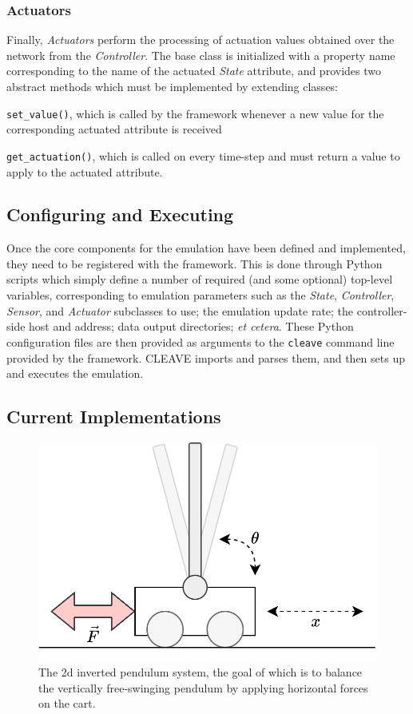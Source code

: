\subsubsection{Actuators}

Finally, \emph{Actuators} perform the processing of actuation values obtained over the network from the \emph{Controller}.
The base class is initialized with a property name corresponding to the name of the actuated \emph{State} attribute, and provides two abstract methods which must be implemented by extending classes:
\begin{enumerate*}[itemjoin={{; }}, itemjoin*={{; and }}]
    \item \texttt{set_value()}, which is called by the framework whenever a new value for the corresponding actuated attribute is received
    \item \texttt{get_actuation()}, which is called on every time-step and must return a value to apply to the actuated attribute.
\end{enumerate*}

\subsection{Configuring and Executing }

Once the core components for the emulation have been defined and implemented, they need to be registered with the framework.
This is done through Python scripts which simply define a number of required (and some optional) top-level variables, corresponding to emulation parameters such as the \emph{State}, \emph{Controller}, \emph{Sensor}, and \emph{Actuator} subclasses to use; the emulation update rate; the controller-side host and address; data output directories; \emph{et cetera}.
These Python configuration files are then provided as arguments to the \texttt{cleave} command line provided by the framework.
\ac{CLEAVE} imports and parses them, and then sets up and executes the emulation.

\subsection{Current Implementations}

\begin{figure}
    \centering
    \includegraphics[width=.7\columnwidth]{images/inverted_pendulum.png}
    \caption{
        The 2d inverted pendulum system, the goal of which is to balance the vertically free-swinging pendulum by applying horizontal forces on the cart.
    }\label{fig:invpend}
\end{figure}

